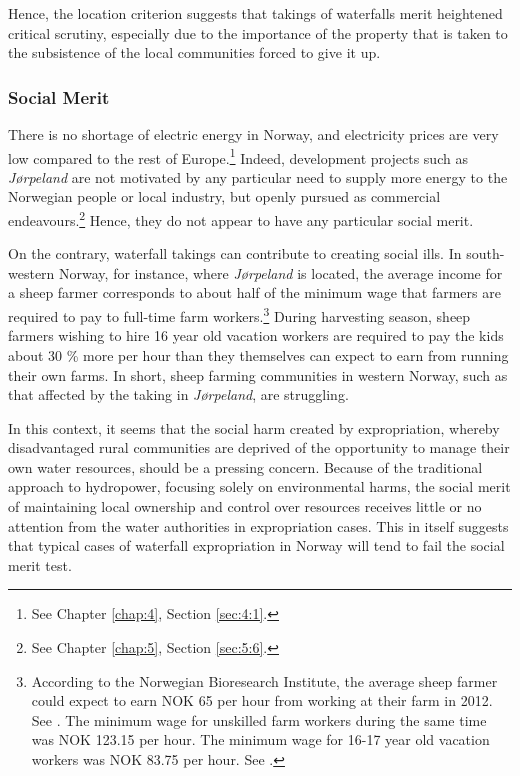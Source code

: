 Hence, the location criterion suggests that takings of waterfalls merit heightened critical scrutiny, especially due to the importance of the property that is taken to the subsistence of the local communities forced to give it up.

\subsubsection{Social Merit}\label{sec:5:7:5}

There is no shortage of electric energy in Norway, and electricity prices are very low compared to the rest of Europe.\footnote{See Chapter \ref{chap:4}, Section \ref{sec:4:1}.} Indeed, development projects such as {\it Jørpeland} are not motivated by any particular need to supply more energy to the Norwegian people or local industry, but openly pursued as commercial endeavours.\footnote{See Chapter \ref{chap:5}, Section \ref{sec:5:6}.} Hence, they do not appear to have any particular social merit.

On the contrary, waterfall takings can contribute to creating social ills. In south-western Norway, for instance, where {\it Jørpeland} is located, the average income for a sheep farmer corresponds to about half of the minimum wage that farmers are required to pay to full-time farm workers.\footnote{According to the Norwegian Bioresearch Institute, the average sheep farmer could expect to earn NOK 65 per hour from working at their farm in 2012. See \cite[50]{smesdal14}. The minimum wage for unskilled farm workers during the same time was NOK 123.15 per hour. The minimum wage for 16-17 year old vacation workers was NOK 83.75 per hour. See \cite{tariff12}.} During harvesting season, sheep farmers wishing to hire 16 year old vacation workers are required to pay the kids about 30 \% more per hour than they themselves can expect to earn from running their own farms. In short, sheep farming communities in western Norway, such as that affected by the taking in {\it Jørpeland}, are struggling.

In this context, it seems that the social harm created by expropriation, whereby disadvantaged rural communities are deprived of the opportunity to manage their own water resources, should be a pressing concern. Because of the traditional approach to hydropower, focusing solely on environmental harms, the social merit of maintaining local ownership and control over resources receives little or no attention from the water authorities in expropriation cases. This in itself suggests that typical cases of waterfall expropriation in Norway will tend to fail the social merit test.

